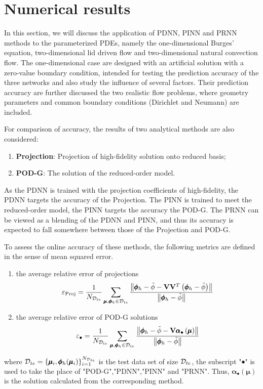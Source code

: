 \documentclass[preprint, 10pt]{elsarticle}
\begin{document}
\section{Numerical results}
In this section,
we will discuss the application of PDNN, PINN and PRNN methods to the parameterized PDEs, namely the one-dimensional Burges' equation, two-dimensional lid driven flow and two-dimensional natural convection flow.
The one-dimensional case are designed with an artificial solution with a zero-value boundary condition, intended for testing the prediction accuracy of the three networks and also study the influence of several factors. Their prediction accuracy are further discussed the two realistic flow problems, where geometry parameters and common boundary conditions (Dirichlet and Neumann) are included.

For comparison of accuracy, the results of two analytical methods are also considered:
\begin{enumerate}[(1)]
\item \textbf{Projection}: Projection of high-fidelity solution onto reduced basis;
\item \textbf{POD-G}: The solution of the reduced-order model.
\end{enumerate}
As the PDNN is trained with the projection coefficients of high-fidelity, the PDNN targets the accuracy of the Projection. The PINN is trained to meet the reduced-order model, the PINN targets the accuracy the POD-G. The PRNN can be viewed as a blending of the PDNN and PINN, and thus its accuracy is expected to fall somewhere between those of the Projection and POD-G.

To assess the online accuracy of these methods, the following metrics are defined in the sense of mean squared error.
\begin{enumerate}[(1)]
\item the average relative error of  projections
\begin{equation}
\varepsilon_{\rm{Proj}}
=\frac{1}{N_{{\cal D}_{te}}}
\sum\limits_{\pmb\mu ,\pmb{\phi}_h  \in {{\cal D}_{te}}}{
\frac{\left\| \pmb{\phi}_h - \tilde{\phi} -\mathbf{V}\mathbf{V}^T \left( \pmb{\phi}_h - \tilde{\phi} \right)  \right\|}
{\left\| \pmb{\phi}_h  - \tilde{\phi} \right\|}
}
\end{equation}

\item the average relative error of POD-G solutions
\begin{equation}
\varepsilon_{\bullet}
=\frac{1}{N_{{\cal D}_{te}}}
\sum\limits_{\pmb\mu ,\pmb{\phi}_h  \in {{\cal D}_{te}}}{
\frac{\left\| \pmb{\phi}_h- \tilde{\phi}-\mathbf{V}\pmb{\alpha}_{\bullet}\left( \pmb{\mu}\right)
\right\|}
{\left\| \pmb{\phi}_h - \tilde{\phi} \right\|}
}
\end{equation}

\end{enumerate}
where ${{\cal D}_{te}}=\{\pmb{\mu}_i, \pmb{\phi}_h(\pmb{\mu}_i)\}_{i=1}^{N_{{\cal D}_{te}}}$ is the test data set of size ${{\cal D}_{te}}$, the subscript "$\bullet$" is used to take the place of "POD-G","PDNN","PINN" and "PRNN". Thus, $\pmb{\alpha}_{\bullet}\left( \pmb{\mu}\right)$ is the solution calculated from the corresponding method.
\end{document}
